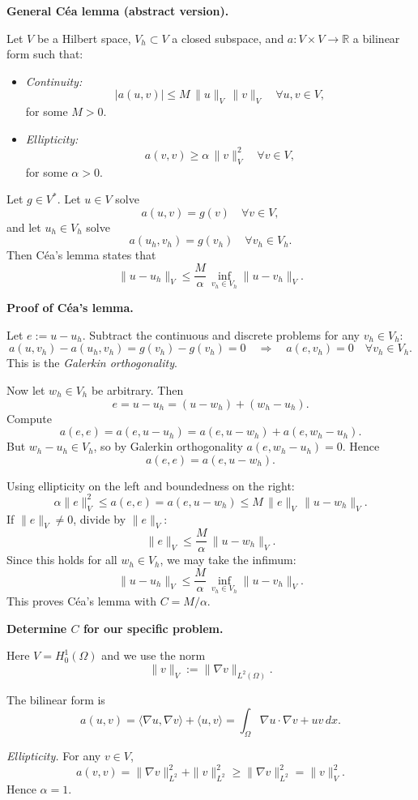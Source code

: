 \textbf{General Céa lemma (abstract version).}

Let \(V\) be a Hilbert space, \(V_h\subset V\) a closed subspace, and \(a:V\times V\to\mathbb{R}\)
a bilinear form such that:
\begin{itemize}
    \item \emph{Continuity:}
          \[
              |a(u,v)| \le M\,\|u\|_V\,\|v\|_V \quad\forall u,v\in V,
          \]
          for some \(M>0\).
    \item \emph{Ellipticity:}
          \[
              a(v,v) \ge \alpha\,\|v\|_V^2 \quad\forall v\in V,
          \]
          for some \(\alpha>0\).
\end{itemize}
Let \(g\in V^\ast\). Let \(u\in V\) solve
\[
    a(u,v) = g(v)\quad\forall v\in V,
\]
and let \(u_h\in V_h\) solve
\[
    a(u_h,v_h) = g(v_h)\quad\forall v_h\in V_h.
\]
Then Céa's lemma states that
\[
    \|u-u_h\|_V \le \frac{M}{\alpha}\,\inf_{v_h\in V_h}\|u-v_h\|_V.
\]

\textbf{Proof of Céa's lemma.}

Let \(e := u-u_h\). Subtract the continuous and discrete problems for any \(v_h\in V_h\):
\[
    a(u,v_h) - a(u_h,v_h) = g(v_h) - g(v_h) = 0
    \quad\Longrightarrow\quad
    a(e,v_h) = 0\quad\forall v_h\in V_h.
\]
This is the \emph{Galerkin orthogonality}.

Now let \(w_h\in V_h\) be arbitrary. Then
\[
    e = u-u_h = (u-w_h) + (w_h-u_h).
\]
Compute
\[
    a(e,e) = a(e,u-u_h) = a(e,u-w_h) + a(e,w_h-u_h).
\]
But \(w_h-u_h\in V_h\), so by Galerkin orthogonality \(a(e,w_h-u_h)=0\). Hence
\[
    a(e,e) = a(e,u-w_h).
\]

Using ellipticity on the left and boundedness on the right:
\[
    \alpha\|e\|_V^2 \le a(e,e) = a(e,u-w_h)
    \le M\,\|e\|_V\,\|u-w_h\|_V.
\]
If \(\|e\|_V\neq 0\), divide by \(\|e\|_V\):
\[
    \|e\|_V \le \frac{M}{\alpha}\,\|u-w_h\|_V.
\]
Since this holds for all \(w_h\in V_h\), we may take the infimum:
\[
    \|u-u_h\|_V
    \le \frac{M}{\alpha}\,\inf_{v_h\in V_h}\|u-v_h\|_V.
\]
This proves Céa's lemma with \(C = M/\alpha\).

\textbf{Determine $C$ for our specific problem.}

Here \(V = H^1_0(\Omega)\) and we use the norm
\[
    \|v\|_V := \|\nabla v\|_{L^2(\Omega)}.
\]

The bilinear form is
\[
    a(u,v) = \langle \nabla u,\nabla v\rangle + \langle u,v\rangle
    = \int_\Omega \nabla u\cdot\nabla v + u v\,dx.
\]

\emph{Ellipticity.}
For any \(v\in V\),
\[
    a(v,v) = \|\nabla v\|_{L^2}^2 + \|v\|_{L^2}^2 \ge \|\nabla v\|_{L^2}^2 = \|v\|_V^2.
\]
Hence \(\alpha = 1\).

